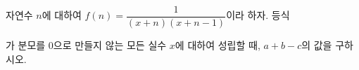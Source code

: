 자연수 $n$에 대하여 $f(n)=\dfrac{1}{(x+n)(x+n-1)}$이라 하자. 등식\par\smallskip{}\par\smallskip\noindent 가 분모를 $0$으로 만들지 않는 모든 실수 $x$에 대하여 성립할 때, $a+b-c$의 값을 구하시오. 
